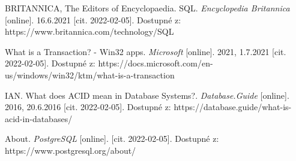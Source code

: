 \begin{thebibliography}{50}
BRITANNICA, The Editors of Encyclopaedia. SQL. \textit{Encyclopedia Britannica} [online]. 16.6.2021 [cit. 2022-02-05]. Dostupné z: https://www.britannica.com/technology/SQL

What is a Transaction? - Win32 apps. \textit{Microsoft} [online]. 2021, 1.7.2021 [cit. 2022-02-05]. Dostupné z: https://docs.microsoft.com/en-us/windows/win32/ktm/what-is-a-transaction

IAN. What does ACID mean in Database Systems?. \textit{Database.Guide} [online]. 2016, 20.6.2016 [cit. 2022-02-05]. Dostupné z: https://database.guide/what-is-acid-in-databases/

About. \textit{PostgreSQL} [online]. [cit. 2022-02-05]. Dostupné z: https://www.postgresql.org/about/


\end{thebibliography}
